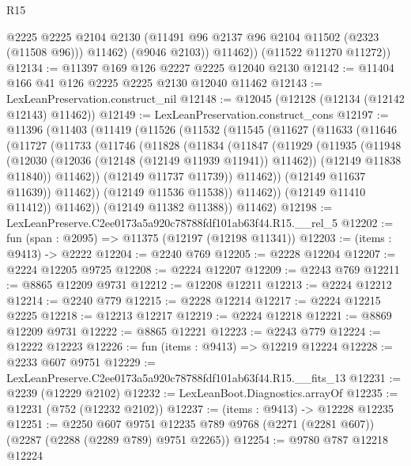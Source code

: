 \begin{lexlean}{R15}
\begin{coremodule}
              @2225
              @2225
              @2104
              @2130
              (@11491 @96 @2137 @96 @2104 @11502 (@2323 (@11508 @96)))
              @11462)
            (@9046 @2103))
          @11462))
      (@11522 @11270 @11272))
@12134 := @11397 @169 @126 @2227 @2225 @12040 @2130
@12142 := @11404 @166 @41 @126 @2225 @2225 @2130 @12040 @11462
@12143 := LexLeanPreservation.construct_nil
@12148 := @12045 (@12128 (@12134 (@12142 @12143) @11462))
@12149 := LexLeanPreservation.construct_cons
@12197 := @11396
    (@11403
      (@11419
        (@11526
          (@11532
            (@11545
              (@11627
                (@11633
                  (@11646
                    (@11727
                      (@11733
                        (@11746
                          (@11828
                            (@11834
                              (@11847
                                (@11929
                                  (@11935
                                    (@11948
                                      (@12030 (@12036 (@12148 (@12149 @11939 @11941)) @11462))
                                      (@12149 @11838 @11840))
                                    @11462))
                                (@12149 @11737 @11739))
                              @11462))
                          (@12149 @11637 @11639))
                        @11462))
                    (@12149 @11536 @11538))
                  @11462))
              (@12149 @11410 @11412))
            @11462))
        (@12149 @11382 @11388))
      @11462)
@12198 := LexLeanPreserve.C2ee0173a5a920c78788fdf101ab63f44.R15.__rel_5
@12202 := fun (span : @2095) => @11375 (@12197 (@12198 @11341))
@12203 := (items : @9413) -> @2222
@12204 := @2240 @769
@12205 := @2228 @12204
@12207 := @2224 @12205 @9725
@12208 := @2224 @12207
@12209 := @2243 @769
@12211 := @8865 @12209 @9731
@12212 := @12208 @12211
@12213 := @2224 @12212
@12214 := @2240 @779
@12215 := @2228 @12214
@12217 := @2224 @12215 @2225
@12218 := @12213 @12217
@12219 := @2224 @12218
@12221 := @8869 @12209 @9731
@12222 := @8865 @12221
@12223 := @2243 @779
@12224 := @12222 @12223
@12226 := fun (items : @9413) => @12219 @12224
@12228 := @2233 @607 @9751
@12229 := LexLeanPreserve.C2ee0173a5a920c78788fdf101ab63f44.R15.__fits_13
@12231 := @2239 (@12229 @2102)
@12232 := LexLeanBoot.Diagnostics.arrayOf
@12235 := @12231 (@752 (@12232 @2102))
@12237 := (items : @9413) -> @12228 @12235
@12251 := @2250
    @607
    @9751
    @12235
    @789
    @9768
    (@2271 (@2281 @607))
    (@2287 (@2288 (@2289 @789) @9751 @2265))
@12254 := @9780 @787 @12218 @12224

\end{coremodule}
\end{lexlean}
